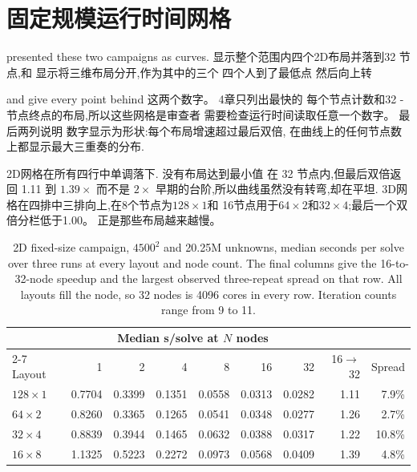 \documentclass[11pt,a4paper,oneside]{report}
\begin{document}
\section{固定规模运行时间网格}
\label{app:strong20m-grids}

 presented these two campaigns as curves. 
显示整个范围内四个2D布局并落到32
节点,和  显示将三维布局分开,作为其中的三个
四个人到了最低点 然后向上转

 and  give every point behind
这两个数字。 4章只列出最快的
每个节点计数和32 - 节点终点的布局,所以这些网格是审查者
需要检查运行时间读取任意一个数字。 最后两列说明
数字显示为形状:每个布局增速超过最后双倍,
在曲线上的任何节点数上都显示最大三重奏的分布.

2D网格在所有四行中单调落下. 没有布局达到最小值
在 32 节点内,但最后双倍返回 1.11 到 $1.39\times$ 而不是
$2\times$ 早期的台阶,所以曲线虽然没有转弯,却在平坦.
3D网格在四排中三排向上,在8个节点为$128\times1$和
16节点用于$64\times2$和$32\times4$;最后一个双倍分栏低于1.00。
正是那些布局越来越慢。

\begin{table}[htbp]
  \centering
  \caption{2D fixed-size campaign, $4500^2$ and 20.25M unknowns, median seconds per solve
  over three runs at every layout and node count. The final columns give the 16-to-32-node
  speedup and the largest observed three-repeat spread on that row. All layouts fill the
  node, so 32 nodes is 4096 cores in every row. Iteration counts range from 9 to 11.}
  \label{tab:strong20m-grid-2d}
  \begin{tabular}{lrrrrrrrr}
    \toprule
    & \multicolumn{6}{c}{Median s/solve at $N$ nodes} & & \\
    \cmidrule(lr){2-7}
    Layout & 1 & 2 & 4 & 8 & 16 & 32 & 16$\to$32 & Spread \\
    \midrule
    $128\times1$ & 0.7704 & 0.3399 & 0.1351 & 0.0558 & 0.0313 & 0.0282 & 1.11 & 7.9\% \\
    $64\times2$ & 0.8260 & 0.3365 & 0.1265 & 0.0541 & 0.0348 & 0.0277 & 1.26 & 2.7\% \\
    $32\times4$ & 0.8839 & 0.3944 & 0.1465 & 0.0632 & 0.0388 & 0.0317 & 1.22 & 10.8\% \\
    $16\times8$ & 1.1325 & 0.5223 & 0.2272 & 0.0973 & 0.0568 & 0.0409 & 1.39 & 4.8\% \\
    \bottomrule
  \end{tabular}
\end{table}
\end{document}
